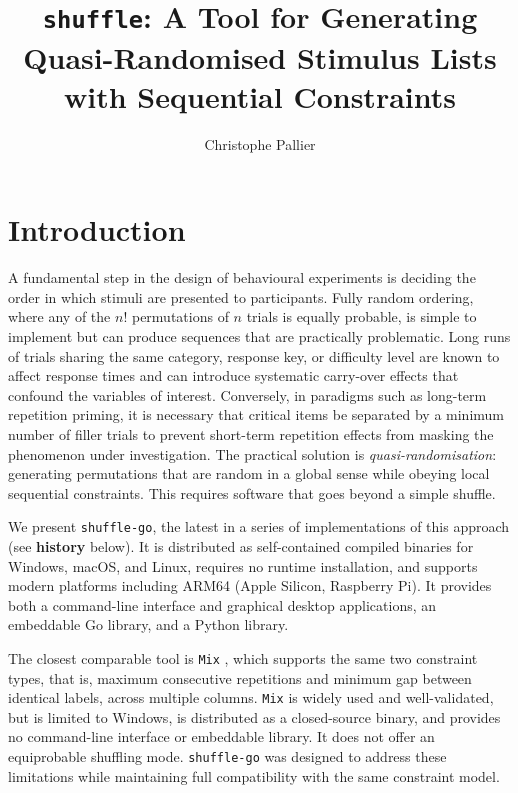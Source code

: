 \documentclass[doc,a4paper,biblatex]{apa7}
\title{\texttt{shuffle}: A Tool for Generating Quasi-Randomised Stimulus Lists with Sequential Constraints}
\author{Christophe Pallier}
\affiliation{Cognitive Neuroimaging Unit, CNRS INSERM CEA}
\begin{document}
\maketitle

\newpage


\section{Introduction}
\label{sec:introduction}

A fundamental step in the design of behavioural experiments is
deciding the order in which stimuli are presented to
participants. Fully random ordering, where any of the $n!$
permutations of $n$ trials is equally probable, is simple to implement
but can produce sequences that are practically problematic. Long runs of
trials sharing the same category, response key, or difficulty level
are known to affect response times \parencite{luce1986} and can
introduce systematic carry-over effects that confound the variables of
interest. Conversely, in paradigms such as long-term repetition
priming, it is necessary that critical items be separated by a minimum
number of filler trials to prevent short-term repetition effects from
masking the phenomenon under investigation. The practical solution is
\textit{quasi-randomisation}: generating permutations that are random
in a global sense while obeying local sequential constraints. This
requires software that goes beyond a simple shuffle.

We present \texttt{shuffle-go}, the latest in a series of implementations
of this approach (see \textbf{history} below). It is distributed as
self-contained compiled binaries for Windows, macOS, and Linux, requires
no runtime installation, and supports modern platforms including ARM64
(Apple Silicon, Raspberry Pi). It provides both a command-line interface and
graphical desktop applications, an embeddable Go library, and a Python
library.

The closest comparable tool is \texttt{Mix} \parencite{vancasteren2006},
which supports the same two constraint types, that is, maximum consecutive
repetitions and minimum gap between identical labels, across multiple
columns. \texttt{Mix} is widely used and well-validated, but is limited
to Windows, is distributed as a closed-source binary, and provides no
command-line interface or embeddable library. It does not offer an
equiprobable shuffling mode. \texttt{shuffle-go} was designed to address
these limitations while maintaining full compatibility with the same
constraint model.
\end{document}
